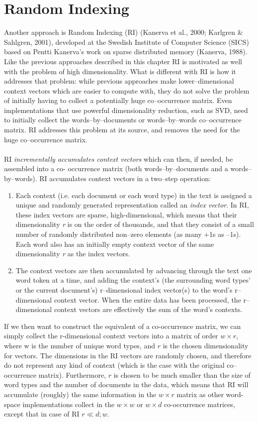 \newpage
\section{Random Indexing}\label{RI}
Another approach is Random Indexing (RI) (Kanerva et al., 2000; Karlgren \& Sahlgren, 2001), developed
 at the Swedish Institute of Computer Science (SICS) based on Pentti Kanerva's work on sparse
 distributed memory (Kanerva, 1988)\cite{kanerva88}. Like the previous approaches described in 
this chapter RI 
is motivated as well with the problem of high dimensionality. What is different with RI is how it addresses 
that problem: while previous approaches make lower--dimensional context vectors which are
 easier to compute with, they do not solve the problem of initially having to collect a potentially
 huge co--occurrence matrix. Even implementations that use powerful dimensionality reduction, such
as SVD, need to initially collect the words--by--documents or words--by--words co--occurrence
matrix. RI addresses this problem at its source, and removes the need for the huge co--occurrence 
matrix.
\\\\
RI \textit{incrementally accumulates context vectors} which can then, if needed, be assembled into a co-
occurrence matrix (both words--by--documents and a words--by--words). RI accumulates context vectors 
in a two--step operation:
\begin{enumerate}
\item Each context (i.e. each document or each word type) in the text is assigned a
unique and randomly generated representation called an \textit{index vector}. In RI,
these index vectors are sparse, high-dimensional, which means
that their dimensionality \emph{r} is on the order of thousands, and that they consist of a small number 
 of randomly distributed non--zero elements (as many +1s as --1s). Each word also has an initially
 empty context vector of the same dimensionality \emph{r} as the index vectors.
\item The context vectors are then accumulated by advancing through the text one word token at 
a time, and adding the context's (the surrounding word types' or the current document's)
 r--dimensional index vector(s) to the word's r--dimensional context vector. When the entire data 
has been processed, the r--dimensional context vectors are effectively the sum of the word's contexts.
\end{enumerate}

If we then want to construct the equivalent of a co-occurrence matrix, we can simply
collect the r-dimensional context vectors into a matrix of order $w\times r$, where w
 is the number of unique word types, and $r$ is the chosen dimensionality for vectors. The dimensions in 
the RI vectors are randomly chosen, and therefore do not represent any kind of context (which is the case with the original co--occurrence matrix). Furthermore,
$r$ is chosen to be much smaller than the size of word types and the number of
documents in the data, which means that RI will accumulate (roughly) the same
information in the $w\times r$ matrix as other word-space implementations collect in the
 $w\times w$ or  $w\times d$ co-occurrence matrices, except that in case of RI $r \ll d;w$.

